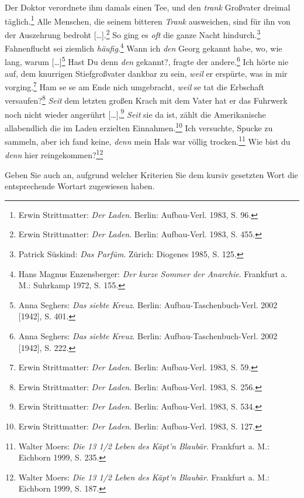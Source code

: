 \ea \label{ea:A_Wortarten}     
\ea \label{ea:A_trankV} Der Doktor verordnete ihm damals einen Tee, und den \textit{trank} Großvater dreimal täglich.\footnote{Erwin Strittmatter: \textit{Der Laden}. Berlin: Aufbau-Verl. 1983, S. 96.}
\ex \label{ex:A_trankSubst} Alle Menschen, die seinem bitteren \textit{Trank} ausweichen, sind für ihn von der Auszehrung bedroht [\ldots{}].\footnote{Erwin Strittmatter: \textit{Der Laden}. Berlin: Aufbau-Verl. 1983, S. 455.}
\ex \label{ex:A_oftAdv}  So ging es \textit{oft} die ganze Nacht hindurch.\footnote{Patrick Süskind: \textit{Das Parfüm}. Zürich: Diogenes 1985, S. 125.}
\ex \label{ex:A_häufigA} Fahnenflucht sei ziemlich \textit{häufig}.\footnote{Hans Magnus Enzensberger: \textit{Der kurze Sommer der Anarchie}. Frankfurt a. M.: Suhrkamp 1972, S. 155.}
\ex \label{ex:A_den_Art}  Wann ich \textit{den} Georg gekannt habe, wo, wie lang, warum [\ldots{}]\footnote{Anna Seghers: \textit{Das siebte Kreuz}. Berlin: Aufbau-Taschenbuch-Verl. 2002 [1942], S. 401.}
\ex \label{ex:A_den_DPrn} Hast Du denn \textit{den} gekannt?, fragte der andere.\footnote{Anna Seghers: \textit{Das siebte Kreuz}. Berlin: Aufbau-Taschenbuch-Verl. 2002 [1942], S. 222.}
\ex \label{ex:A_weil_Subjunktion} Ich hörte nie auf, dem knurrigen Stiefgroßvater dankbar zu sein, \textit{weil} er erspürte, was in mir vorging.\footnote{Erwin Strittmatter: \textit{Der Laden}. Berlin: Aufbau-Verl. 1983, S. 59.}
\ex \label{ex:A_weil_Konjunktion} Ham se se am Ende nich umgebracht, \textit{weil} se tat die Erbschaft versaufen?\footnote{Erwin Strittmatter: \textit{Der Laden}. Berlin: Aufbau-Verl. 1983, S. 256.}
\ex \label{ex:A_seit_Präposition} \textit{Seit} dem letzten großen Krach mit dem Vater hat er das Fuhrwerk noch nicht wieder angerührt [\ldots{}],\footnote{Erwin Strittmatter: \textit{Der Laden}. Berlin: Aufbau-Verl. 1983, S. 534.}
\ex \label{ex:A_seit_Subjunktion} \textit{Seit} sie da ist, zählt die Amerikanische allabendlich die im Laden erzielten Einnahmen.\footnote{Erwin Strittmatter: \textit{Der Laden}. Berlin: Aufbau-Verl. 1983, S. 127.}
\ex \label{ex:A_denn_Konjunktion} Ich versuchte, Spucke zu sammeln, aber ich fand keine, \textit{denn} mein Hals war völlig trocken.\footnote{Walter Moers: \textit{Die 13 1/2 Leben des Käpt'n Blaubär}. Frankfurt a. M.: Eichborn 1999, S. 235.}
\ex \label{ex:A_denn_Partikel} Wie bist du \textit{denn} hier reingekommen?\footnote{Walter Moers: \textit{Die 13 1/2 Leben des Käpt'n Blaubär}. Frankfurt a. M.: Eichborn 1999, S. 187.}
\z 
\z 

Geben Sie auch an, aufgrund welcher Kriterien Sie dem kursiv gesetzten Wort die entsprechende Wortart zugewiesen haben.


